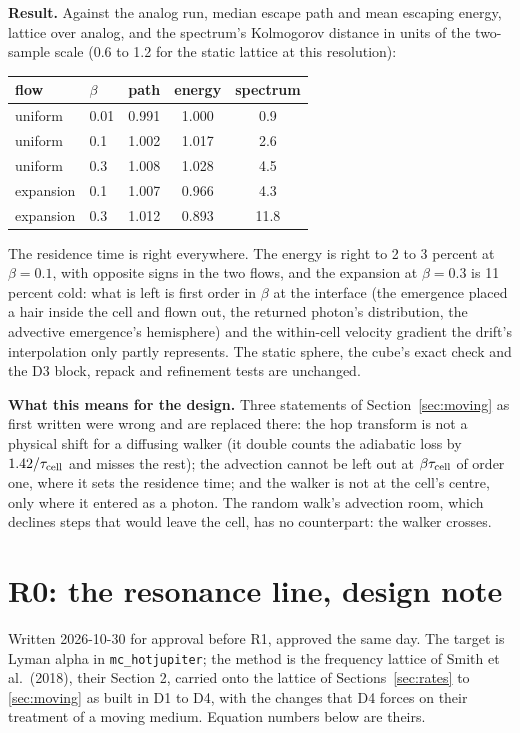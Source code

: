 \documentclass[11pt]{article}
\begin{document}
\textbf{Result.}  Against the analog run, median escape path and mean escaping energy,
lattice over analog, and the spectrum's Kolmogorov distance in units of the two-sample
scale (0.6 to 1.2 for the static lattice at this resolution):
\begin{center}
\begin{tabular}{llccc}
flow & $\beta$ & path & energy & spectrum \\
\hline
uniform & 0.01 & 0.991 & 1.000 & 0.9 \\
uniform & 0.1 & 1.002 & 1.017 & 2.6 \\
uniform & 0.3 & 1.008 & 1.028 & 4.5 \\
expansion & 0.1 & 1.007 & 0.966 & 4.3 \\
expansion & 0.3 & 1.012 & 0.893 & 11.8 \\
\end{tabular}
\end{center}
The residence time is right everywhere.  The energy is right to 2 to 3 percent at
$\beta = 0.1$, with opposite signs in the two flows, and the expansion at $\beta = 0.3$
is 11 percent cold: what is left is first order in $\beta$ at the interface (the
emergence placed a hair inside the cell and flown out, the returned photon's
distribution, the advective emergence's hemisphere) and the within-cell velocity
gradient the drift's interpolation only partly represents.  The static sphere, the
cube's exact check and the D3 block, repack and refinement tests are unchanged.

\textbf{What this means for the design.}  Three statements of Section~\ref{sec:moving}
as first written were wrong and are replaced there: the hop transform is not a
physical shift for a diffusing walker (it double counts the adiabatic loss by
$1.42/\tau_{\rm cell}$ and misses the rest); the advection cannot be left out at
$\beta\tau_{\rm cell}$ of order one, where it sets the residence time; and the walker is
not at the cell's centre, only where it entered as a photon.  The random walk's
advection room, which declines steps that would leave the cell, has no counterpart:
the walker crosses.


\section{R0: the resonance line, design note}
\label{sec:r0}

Written 2026-10-30 for approval before R1, approved the same day.  The target is Lyman alpha in
\texttt{mc\_hotjupiter}; the method is the frequency lattice of Smith et al.\ (2018),
their Section 2, carried onto the lattice of Sections~\ref{sec:rates} to
\ref{sec:moving} as built in D1 to D4, with the changes that D4 forces on their
treatment of a moving medium.  Equation numbers below are theirs.
\end{document}
